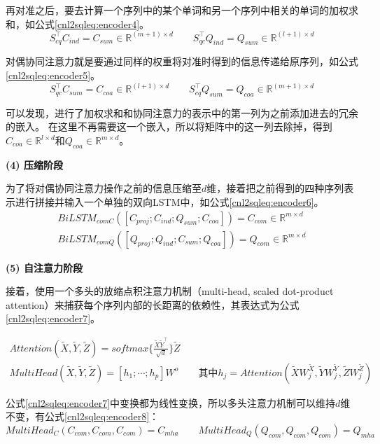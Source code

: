 再对准之后，要去计算一个序列中的某个单词和另一个序列中相关的单词的加权求和，如公式\ref{cnl2sqleq:encoder4}。
\begin{equation}
  \label{cnl2sqleq:encoder4}
  S_{cq}^{\top}C_{ind} = C_{sum} \in \mathbb{R}^{(m+1) \times d} \qquad S_{qc}^{\top}Q_{ind} = Q_{sum} \in \mathbb{R}^{(l+1) \times d}
\end{equation}

对偶协同注意力就是要通过同样的权重将对准时得到的信息传递给原序列，如公式\ref{cnl2sqleq:encoder5}。
\begin{equation}
  \label{cnl2sqleq:encoder5}
  S_{qc}^{\top}C_{sum} = C_{coa} \in \mathbb{R}^{(l+1) \times d} \qquad S_{cq}^{\top}Q_{sum} = Q_{coa} \in \mathbb{R}^{(m+1) \times d}
\end{equation}

可以发现，进行了加权求和和协同注意力的表示中的第一列为之前添加进去的冗余的嵌入。
在这里不再需要这一个嵌入，所以将矩阵中的这一列去除掉，得到$C_{coa} \in \mathbb{R}^{l \times d}$和$Q_{coa} \in \mathbb{R}^{m \times d}$。

\textbf{(4) 压缩阶段}

为了将对偶协同注意力操作之前的信息压缩至$d$维，接着把之前得到的四种序列表示进行拼接并输入一个单独的双向LSTM中，如公式\ref{cnl2sqleq:encoder6}。
\begin{align}
  \label{cnl2sqleq:encoder6}
  BiLSTM_{comC}([C_{proj};C_{ind};Q_{sum};C_{coa}]) =  C_{com} \in \mathbb{R}^{m \times d}\\
  BiLSTM_{comQ}([Q_{proj};Q_{ind};C_{sum};Q_{coa}]) =  Q_{com} \in \mathbb{R}^{m \times d}
\end{align}

\textbf{(5) 自注意力阶段}

接着，使用一个多头的放缩点积注意力机制（multi-head, scaled dot-product attention）\cite{vaswani2017attention}来捕获每个序列内部的长距离的依赖性，其表达式为公式\ref{cnl2sqleq:encoder7}。

\begin{gather}
  \label{cnl2sqleq:encoder7}
  Attention(\widetilde{X},\widetilde{Y},\widetilde{Z}) = softmax\{\frac{\widetilde{X}\widetilde{Y}^{\top}}{\sqrt{d}}\} \widetilde{Z}\\
  MultiHead(\widetilde{X},\widetilde{Y},\widetilde{Z}) = [h_1;\cdots;h_p]W^o \qquad \mbox{其中}h_j= Attention(\widetilde{X}W^{\widetilde{X}}_j,\widetilde{Y}W^{\widetilde{Y}}_j,\widetilde{Z}W^{\widetilde{Z}}_j)
\end{gather}

公式\ref{cnl2sqleq:encoder7}中变换都为线性变换，所以多头注意力机制可以维持$d$维不变，有公式\ref{cnl2sqleq:encoder8}：
\begin{equation}
  \label{cnl2sqleq:encoder8}
  MultiHead_C(C_{com},C_{com},C_{com}) = C_{mha} \qquad MultiHead_Q(Q_{com},Q_{com},Q_{com}) = Q_{mha}
 \end{equation}

